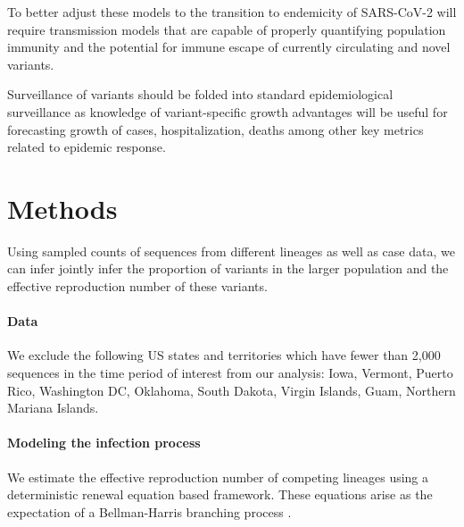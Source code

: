 \documentclass[11pt,oneside,letterpaper]{article}
\begin{document}
To better adjust these models to the transition to endemicity of SARS-CoV-2 will require transmission models that are capable of properly quantifying population immunity and the potential for immune escape of currently circulating and novel variants.

Surveillance of variants should be folded into standard epidemiological surveillance as knowledge of variant-specific growth advantages will be useful for forecasting growth of cases, hospitalization, deaths among other key metrics related to epidemic response.



\section*{Methods}

Using sampled counts of sequences from different lineages as well as case data, we can infer jointly infer the proportion of variants in the larger population and the effective reproduction number of these variants.

\paragraph{Data}

We exclude the following US states and territories which have fewer than 2,000 sequences in the time period of interest from our analysis: Iowa, Vermont, Puerto Rico, Washington DC, Oklahoma, South Dakota, Virgin Islands, Guam, Northern Mariana Islands.

\paragraph{Modeling the infection process}%

We estimate the effective reproduction number of competing lineages using a deterministic renewal equation based framework. These equations arise as the expectation of a Bellman-Harris branching process \cite{Bellman1948}. %
\end{document}
